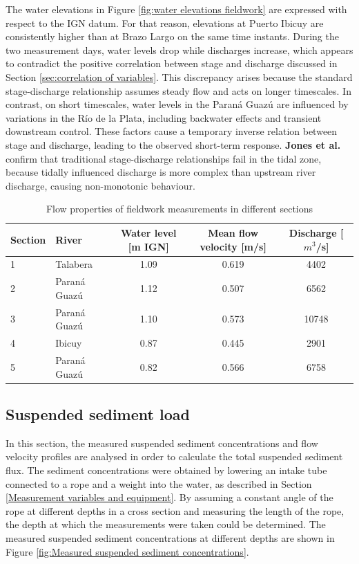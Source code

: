The water elevations in Figure \ref{fig:water elevations fieldwork} are expressed with respect to the IGN datum. For that reason, elevations at Puerto Ibicuy are consistently higher than at Brazo Largo on the same time instants. During the two measurement days, water levels drop while discharges increase, which appears to contradict the positive correlation between stage and discharge discussed in Section \ref{sec:correlation of variables}. This discrepancy arises because the standard stage-discharge relationship assumes steady flow and acts on longer timescales. In contrast, on short timescales, water levels in the Paraná Guazú are influenced by variations in the Río de la Plata, including backwater effects and transient downstream control. These factors cause a temporary inverse relation between stage and discharge, leading to the observed short-term response. \textbf{Jones et al.} confirm that traditional stage-discharge relationships fail in the tidal zone, because tidally influenced discharge is more complex than upstream river discharge, causing non-monotonic behaviour. 

\begin{table}[H]
    \centering
    \renewcommand{\arraystretch}{1.2} %
    \setlength{\tabcolsep}{8pt}       %
    \caption{Flow properties of fieldwork measurements in different sections}
    \begin{tabular}{llccc}
        \toprule
        \textbf{Section} & \textbf{River} & \textbf{Water level [m IGN]} & \textbf{Mean flow velocity [m/s]} & \textbf{Discharge [$m^3$/s]} \\
        \midrule
        1 & Talabera       & 1.09 & 0.619 & 4402 \\
        2 & Paraná Guazú   & 1.12 & 0.507 & 6562 \\
        3 & Paraná Guazú   & 1.10 & 0.573 & 10748 \\
        \midrule
        4 & Ibicuy & 0.87 & 0.445 & 2901 \\
        5 & Paraná Guazú   & 0.82 & 0.566 & 6758 \\
        \bottomrule
    \end{tabular}
    \label{tab:discharges fieldwork}
\end{table}




\subsection{Suspended sediment load}
In this section, the measured suspended sediment concentrations and flow velocity profiles are analysed in order to calculate the total suspended sediment flux. The sediment concentrations were obtained by lowering an intake tube connected to a rope and a weight into the water, as described in Section \ref{Measurement variables and equipment}. By assuming a constant angle of the rope at different depths in a cross section and measuring the length of the rope, the depth at which the measurements were taken could be determined. The measured suspended sediment concentrations at different depths are shown in Figure \ref{fig:Measured suspended sediment concentrations}.

